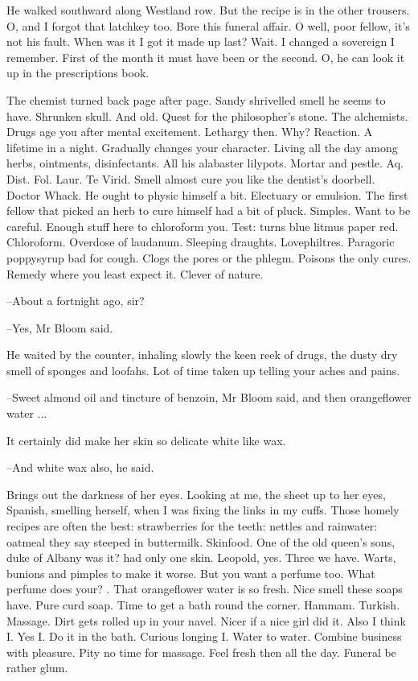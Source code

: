 He walked southward along Westland row.
But the recipe is in the other trousers.
O, and I forgot that latchkey too.
Bore
this funeral affair.
O well, poor fellow,
it's not his fault.
When was it I got it made up last?
Wait.
I changed a sovereign I remember.
First of the month it must have been
or the second.
O, he can look it up in the prescriptions book.

The chemist turned back page after page.
Sandy shrivelled smell he seems to have.
Shrunken skull.
And old.
Quest for the philosopher's stone.
The alchemists.
Drugs age you after mental excitement.
Lethargy then.
Why?
Reaction.
A lifetime in a night.
Gradually changes your character.
Living all the day among herbs, ointments, disinfectants.
All his alabaster lilypots.
Mortar and pestle.
Aq.
Dist.
Fol.
Laur.
Te Virid.
Smell almost cure you like the dentist's doorbell.
Doctor Whack.
He ought to physic himself a bit.
Electuary or emulsion.
The first fellow that picked an herb to cure himself had a bit of pluck.
Simples.
Want to be
careful.
Enough stuff here to chloroform you.
Test: turns blue litmus paper red.
Chloroform.
Overdose of laudanum.
Sleeping draughts.
Lovephiltres.
Paragoric poppysyrup bad for cough.
Clogs the pores or the phlegm.
Poisons the only cures.
Remedy where you least expect it.
Clever of nature.

--About a fortnight ago, sir?

--Yes,
Mr Bloom said.

He waited by the counter,
inhaling slowly the keen reek of drugs,
the dusty dry smell of sponges and loofahs.
Lot of time taken up telling your
aches and pains.

--Sweet almond oil and tincture of benzoin,
Mr Bloom said,
and then orangeflower water ...

It certainly did make her skin so delicate white like wax.

--And white wax also,
he said.

Brings out the darkness of her eyes.
Looking at me,
the sheet up to her eyes,
Spanish,
smelling herself,
when I was fixing the links in my cuffs.
Those homely recipes are often the best:
strawberries for the teeth:
nettles and rainwater:
oatmeal they say steeped in buttermilk.
Skinfood.
One of the old queen's sons,
duke of Albany was it?
had only one skin.
Leopold, yes.
Three we have.
Warts, bunions and pimples to make it worse.
But you want a perfume too.
What perfume does your?
.
That orangeflower water is so fresh.
Nice smell these soaps have.
Pure curd soap.
Time to get a bath round the corner.
Hammam.
Turkish.
Massage.
Dirt gets rolled up in your navel.
Nicer if a nice girl did it.
Also I think I.
Yes I.
Do it in the bath.
Curious longing I.
Water to water.
Combine business with pleasure.
Pity no time for massage.
Feel fresh then all the day.
Funeral be rather glum.

